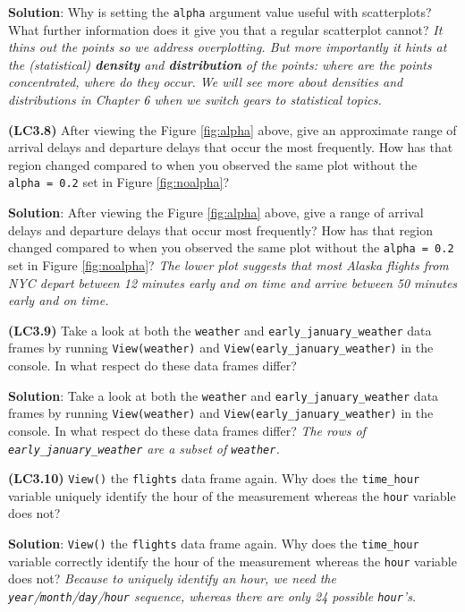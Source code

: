 \documentclass[12pt, krantz2,]{krantz}
\begin{document}
\textbf{Solution}: Why is setting the \texttt{alpha} argument value useful with scatterplots? What further information does it give you that a regular scatterplot cannot? \emph{It thins out the points so we address overplotting. But more importantly it hints at the (statistical) \textbf{density} and \textbf{distribution} of the points: where are the points concentrated, where do they occur. We will see more about densities and distributions in Chapter 6 when we switch gears to statistical topics.}

\textbf{(LC3.8)} After viewing the Figure \ref{fig:alpha} above, give an approximate range of arrival delays and departure delays that occur the most frequently. How has that region changed compared to when you observed the same plot without the \texttt{alpha\ =\ 0.2} set in Figure \ref{fig:noalpha}?

\textbf{Solution}: After viewing the Figure \ref{fig:alpha} above, give a range of arrival delays and departure delays that occur most frequently? How has that region changed compared to when you observed the same plot without the \texttt{alpha\ =\ 0.2} set in Figure \ref{fig:noalpha}? \emph{The lower plot suggests that most Alaska flights from NYC depart between 12 minutes early and on time and arrive between 50 minutes early and on time.}

\textbf{(LC3.9)} Take a look at both the \texttt{weather} and \texttt{early\_january\_weather} data frames by running \texttt{View(weather)} and \texttt{View(early\_january\_weather)} in the console. In what respect do these data frames differ?

\textbf{Solution}: Take a look at both the \texttt{weather} and \texttt{early\_january\_weather} data frames by running \texttt{View(weather)} and \texttt{View(early\_january\_weather)} in the console. In what respect do these data frames differ? \emph{The rows of \texttt{early\_january\_weather} are a subset of \texttt{weather}.}

\textbf{(LC3.10)} \texttt{View()} the \texttt{flights} data frame again. Why does the \texttt{time\_hour} variable uniquely identify the hour of the measurement whereas the \texttt{hour} variable does not?

\textbf{Solution}: \texttt{View()} the \texttt{flights} data frame again. Why does the \texttt{time\_hour} variable correctly identify the hour of the measurement whereas the \texttt{hour} variable does not? \emph{Because to uniquely identify an hour, we need the \texttt{year}/\texttt{month}/\texttt{day}/\texttt{hour} sequence, whereas there are only 24 possible \texttt{hour}'s.}
\end{document}
